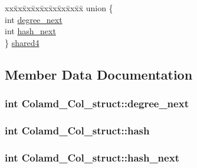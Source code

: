 \begin{DoxyCompactItemize}
\begin{tabbing}
\end{tabbing}\item 
\begin{tabbing}
xx\=xx\=xx\=xx\=xx\=xx\=xx\=xx\=xx\=\kill
union \{\\
\>int \hyperlink{structColamd__Col__struct_a39ab48d1ea2a8f6d365b60886c9ac5a1}{degree\_next}\\
\>int \hyperlink{structColamd__Col__struct_a640f93b7885fb94b7dc0330041b53795}{hash\_next}\\
\} \hyperlink{structColamd__Col__struct_a61f5b5935731b666a1e5bdd72109d494}{shared4}\\

\end{tabbing}\end{DoxyCompactItemize}


\subsection{Member Data Documentation}
\hypertarget{structColamd__Col__struct_a39ab48d1ea2a8f6d365b60886c9ac5a1}{}
\subsubsection[{degree\+\_\+next}]{\setlength{\rightskip}{0pt plus 5cm}int Colamd\+\_\+\+Col\+\_\+struct\+::degree\+\_\+next}\label{structColamd__Col__struct_a39ab48d1ea2a8f6d365b60886c9ac5a1}
\hypertarget{structColamd__Col__struct_ababfe23e6edb41b345085470e52d7264}{}
\subsubsection[{hash}]{\setlength{\rightskip}{0pt plus 5cm}int Colamd\+\_\+\+Col\+\_\+struct\+::hash}\label{structColamd__Col__struct_ababfe23e6edb41b345085470e52d7264}
\hypertarget{structColamd__Col__struct_a640f93b7885fb94b7dc0330041b53795}{}
\subsubsection[{hash\+\_\+next}]{\setlength{\rightskip}{0pt plus 5cm}int Colamd\+\_\+\+Col\+\_\+struct\+::hash\+\_\+next}\label{structColamd__Col__struct_a640f93b7885fb94b7dc0330041b53795}
\hypertarget{structColamd__Col__struct_a16435510e5d93025bb7b9f5715a5ba1c}{}
